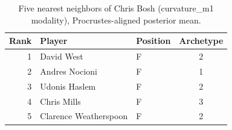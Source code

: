 \begin{table}[htbp]
  \centering\small
  \begin{tabular}{rllc}
    \toprule
    Rank & Player & Position & Archetype \\
    \midrule
    1 & David West & F & 2 \\
    2 & Andres Nocioni & F & 1 \\
    3 & Udonis Haslem & F & 2 \\
    4 & Chris Mills & F & 3 \\
    5 & Clarence Weatherspoon & F & 2 \\
    \bottomrule
  \end{tabular}
  \caption{Five nearest neighbors of Chris Bosh (curvature_m1 modality), Procrustes-aligned posterior mean.}
  \label{tab:Chris_Bosh_neighbors_curvature_m1}
\end{table}

